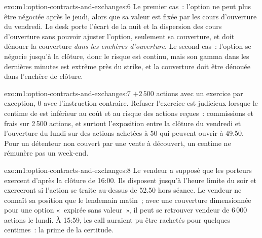 \begin{solution}{exo:m1:option-contracts-and-exchanges:6}
Le premier cas~: l'option ne peut plus être négociée après le jeudi, alors que sa valeur est fixée
par les cours d'ouverture du vendredi. Le desk porte l'écart de la nuit et la
dispersion des cours d'ouverture sans pouvoir ajuster l'option, seulement
sa couverture, et doit dénouer la couverture \emph{dans les enchères d'ouverture}. Le
second cas~: l'option se négocie jusqu'à la clôture, donc le risque est continu, mais son
gamma dans les dernières minutes est extrême près du strike, et la couverture doit être
dénouée dans l'enchère de clôture.
\end{solution}

\begin{solution}{exo:m1:option-contracts-and-exchanges:7}
$+2\,500$ actions avec un exercice par exception, 0 avec l'instruction contraire.
Refuser l'exercice est judicieux lorsque le centime de  est inférieur au coût
et au risque des actions reçues~: commissions et frais sur 2\,500 actions, et
surtout l'exposition entre la clôture du vendredi et l'ouverture du lundi sur des actions achetées
à 50 qui peuvent ouvrir à 49.50. Pour un détenteur non couvert par une vente à découvert, un centime
ne rémunère pas un week-end.
\end{solution}

\begin{solution}{exo:m1:option-contracts-and-exchanges:8}
Le vendeur a supposé que les porteurs exercent d'après la clôture de 16:00.
Ils disposent jusqu'à l'heure limite du soir et exerceront si l'action se traite
au-dessus de 52.50 hors séance. Le vendeur ne connaît sa position que
le lendemain matin~; avec une couverture dimensionnée pour une option «~expirée sans valeur~», il peut se retrouver vendeur
de 6\,000 actions le lundi. À 15:59, les call auraient pu être rachetés pour
quelques centimes~: la prime de la certitude.
\end{solution}

